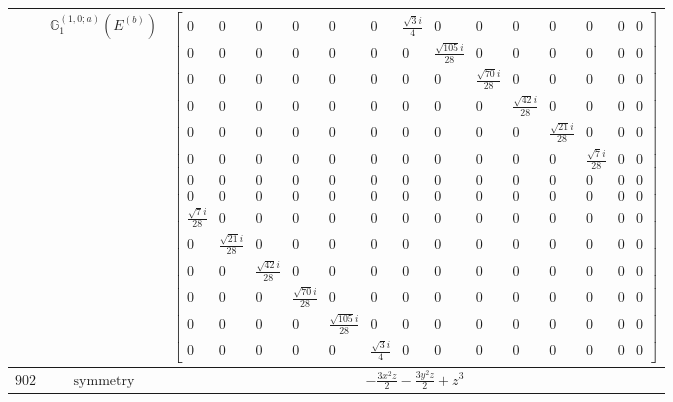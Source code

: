 \documentclass[fleqn,8pt,landscape]{jsarticle}
\begin{document}
\begin{longtable}{ccc}
$  $ & $ \mathbb{G}_{1}^{(1,0;a)}(E^{(b)}) $ & $ \begin{bmatrix} 0 & 0 & 0 & 0 & 0 & 0 & \frac{\sqrt{3} i}{4} & 0 & 0 & 0 & 0 & 0 & 0 & 0 \\ 0 & 0 & 0 & 0 & 0 & 0 & 0 & \frac{\sqrt{105} i}{28} & 0 & 0 & 0 & 0 & 0 & 0 \\ 0 & 0 & 0 & 0 & 0 & 0 & 0 & 0 & \frac{\sqrt{70} i}{28} & 0 & 0 & 0 & 0 & 0 \\ 0 & 0 & 0 & 0 & 0 & 0 & 0 & 0 & 0 & \frac{\sqrt{42} i}{28} & 0 & 0 & 0 & 0 \\ 0 & 0 & 0 & 0 & 0 & 0 & 0 & 0 & 0 & 0 & \frac{\sqrt{21} i}{28} & 0 & 0 & 0 \\ 0 & 0 & 0 & 0 & 0 & 0 & 0 & 0 & 0 & 0 & 0 & \frac{\sqrt{7} i}{28} & 0 & 0 \\ 0 & 0 & 0 & 0 & 0 & 0 & 0 & 0 & 0 & 0 & 0 & 0 & 0 & 0 \\ 0 & 0 & 0 & 0 & 0 & 0 & 0 & 0 & 0 & 0 & 0 & 0 & 0 & 0 \\ \frac{\sqrt{7} i}{28} & 0 & 0 & 0 & 0 & 0 & 0 & 0 & 0 & 0 & 0 & 0 & 0 & 0 \\ 0 & \frac{\sqrt{21} i}{28} & 0 & 0 & 0 & 0 & 0 & 0 & 0 & 0 & 0 & 0 & 0 & 0 \\ 0 & 0 & \frac{\sqrt{42} i}{28} & 0 & 0 & 0 & 0 & 0 & 0 & 0 & 0 & 0 & 0 & 0 \\ 0 & 0 & 0 & \frac{\sqrt{70} i}{28} & 0 & 0 & 0 & 0 & 0 & 0 & 0 & 0 & 0 & 0 \\ 0 & 0 & 0 & 0 & \frac{\sqrt{105} i}{28} & 0 & 0 & 0 & 0 & 0 & 0 & 0 & 0 & 0 \\ 0 & 0 & 0 & 0 & 0 & \frac{\sqrt{3} i}{4} & 0 & 0 & 0 & 0 & 0 & 0 & 0 & 0 \end{bmatrix} $ \\ \hline
$ 902 $ & $ \text{symmetry} $ & $ - \frac{3 x^{2} z}{2} - \frac{3 y^{2} z}{2} + z^{3} $ \\

\end{longtable}
\end{document}
